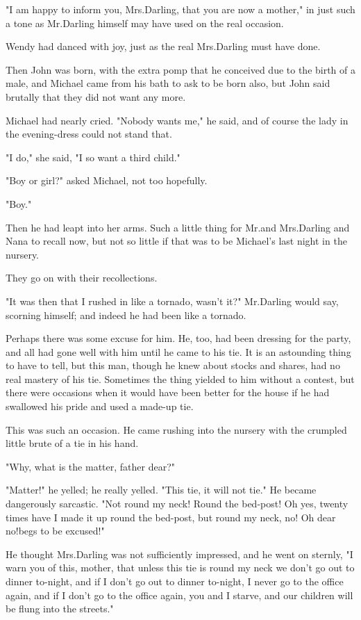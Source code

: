 "I am happy to inform you, Mrs.\@ Darling, that you are now a mother,"
in just such a tone as Mr.\@ Darling himself may have used on the real occasion.

Wendy had danced with joy, just as the real Mrs.\@ Darling must have done.

Then John was born, with the extra pomp that he conceived due to the birth of a male,
and Michael came from his bath to ask to be born also,
but John said brutally that they did not want any more.

Michael had nearly cried.
"Nobody wants me," he said,
and of course the lady in the evening-dress could not stand that.

"I do," she said, "I so want a third child."

"Boy or girl?\@" asked Michael, not too hopefully.

"Boy."

Then he had leapt into her arms.
Such a little thing for Mr.\@ and Mrs.\@ Darling and Nana to recall now,
but not so little if that was to be Michael's last night in the nursery.

They go on with their recollections.

"It was then that I rushed in like a tornado, wasn't it?\@" Mr.\@ Darling would say, scorning himself;
and indeed he had been like a tornado.

Perhaps there was some excuse for him.
He, too, had been dressing for the party,
and all had gone well with him until he came to his tie.
It is an astounding thing to have to tell,
but this man, though he knew about stocks and shares, had no real mastery of his tie.
Sometimes the thing yielded to him without a contest,
but there were occasions when it would have been better for the house
if he had swallowed his pride and used a made-up tie.

This was such an occasion.
He came rushing into the nursery with the crumpled little brute of a tie in his hand.

"Why, what is the matter, father dear?"

"Matter!\@" he yelled;
he really yelled.
"This tie, it will not tie."
He became dangerously sarcastic.
"Not round my neck!
Round the bed-post!
Oh yes, twenty times have I made it up round the bed-post, but round my neck, no!
Oh dear no!\@ begs to be excused!"

He thought Mrs.\@ Darling was not sufficiently impressed, and he went on sternly,
"I warn you of this, mother, that unless this tie is round my neck we don't go out to dinner to-night,
and if I don't go out to dinner to-night, I never go to the office again,
and if I don't go to the office again,
you and I starve, and our children will be flung into the streets."

